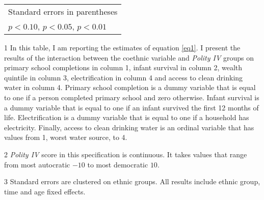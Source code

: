 \begin{table}[htbp]
\begin{adjustbox}{max width=\textwidth}
\begin{threeparttable}[t]
\begin{tabular}{l*{5}{c}}
\hline
\multicolumn{6}{l}{\footnotesize Standard errors in parentheses}\\
\multicolumn{6}{l}{\footnotesize \sym{*} \(p<0.10\), \sym{**} \(p<0.05\), \sym{***} \(p<0.01\)}\\
\end{tabular}
\begin{footnotesize}
 \begin{tablenotes}
     \item[1] In this table, I am reporting the estimates of equation \ref{eq1}. I present the results of the interaction between the coethnic variable and \textit{Polity IV } groups on primary school completions in column 1, infant survival in column 2, wealth quintile in column 3, electrification in column 4 and access to clean drinking water in column 4. Primary school completion is a dummy variable that is equal to one if a person completed primary school and zero otherwise. Infant survival is a dummy variable that is equal to one if an infant survived the first 12 months of life. Electrification is a dummy variable that is equal to one if a household has electricity. Finally, access to clean drinking water is an ordinal variable that has values from 1, worst water source, to 4.
     \item[2] \textit{Polity IV } score in this specification is continuous. It takes values that range from most autocratic $-10$ to most democratic $10$.
     \item[3] Standard errors are clustered on ethnic groups. All results include ethnic group, time and age fixed effects.
   \end{tablenotes}
   \end{footnotesize}
    \end{threeparttable}%
\label{tab:ethdemcont}
\end{adjustbox}
\end{table}
